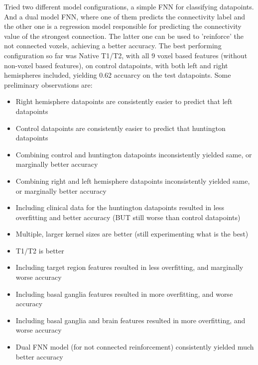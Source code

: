 Tried two different model configurations, a simple FNN for classifying datapoints. And a dual model FNN, where one of them predicts the connectivity label and the other one is a regression model responsible for predicting the connectivity value of the strongest connection. The latter one can be used to 'reinforce' the not connected voxels, achieving a better accuracy. The best performing configuration so far was Native T1/T2, with all 9 voxel based features (without non-voxel based features), on control datapoints, with both left and right hemispheres included, yielding 0.62 accuarcy on the test datapoints. Some preliminary observations are:

\begin{itemize}
  \item Right hemisphere datapoints are consistently easier to predict that left datapoints
  \item Control datapoints are consistently easier to predict that huntington datapoints
  \item Combining control and huntington datapoints inconsistently yielded same, or marginally better accuracy
  \item Combining right and left hemisphere datapoints inconsistently yielded same, or marginally better accuracy
  \item Including clinical data for the huntington datapoints resulted in less overfitting and better accuracy (BUT still worse than control datapoints)
  \item Multiple, larger kernel sizes are better (still experimenting what is the best)
  \item T1/T2 is better
  \item Including target region features resulted in less overfitting, and marginally worse accuracy
  \item Including basal ganglia features resulted in more overfitting, and worse accuracy
  \item Including basal ganglia and brain features resulted in more overfitting, and worse accuracy
  \item Dual FNN model (for not connected reinforcement) consistently yielded much better accuracy
\end{itemize}






